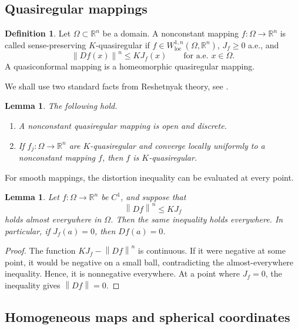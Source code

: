 \documentclass[10pt]{amsart}
\numberwithin{equation}{section}
\newtheorem{lemma}[theorem]{Lemma}
\theoremstyle{definition}
\newtheorem{definition}[theorem]{Definition}
\newcommand{\R}{\mathbb R}
\newcommand{\norm}[1]{\left\|#1\right\|}
\begin{document}
\subsection{Quasiregular mappings}

\begin{definition}
Let \(\Omega\subset\R^n\) be a domain. A nonconstant mapping
\(f:\Omega\to\R^n\) is called sense-preserving \(K\)-quasiregular if
\(f\in W^{1,n}_{\operatorname{loc}}(\Omega,\R^n)\), \(J_f\ge0\) a.e., and
\[
        \norm{Df(x)}^n\le KJ_f(x)
        \qquad\text{for a.e. }x\in\Omega .
\]
A quasiconformal mapping is a homeomorphic quasiregular mapping.
\end{definition}

We shall use two standard facts from Reshetnyak theory, see
\cite{Reshetnyak,Rickman,Vaisala}.

\begin{lemma}
\label{lem-reshetnyak}
The following hold.
\begin{enumerate}[label=(\roman*)]
\item A nonconstant quasiregular mapping is open and discrete.
\item If \(f_j:\Omega\to\R^n\) are \(K\)-quasiregular and converge locally
uniformly to a nonconstant mapping \(f\), then \(f\) is \(K\)-quasiregular.
\end{enumerate}
\end{lemma}

For smooth mappings, the distortion inequality can be evaluated at every
point.

\begin{lemma}
\label{lem-pointwise-distortion}
Let \(f:\Omega\to\R^n\) be \(C^1\), and suppose that
\[
        \norm{Df}^n\le KJ_f
\]
holds almost everywhere in \(\Omega\). Then the same inequality holds
everywhere. In particular, if \(J_f(a)=0\), then \(Df(a)=0\).
\end{lemma}

\begin{proof}
The function \(KJ_f-\norm{Df}^n\) is continuous. If it were negative at some
point, it would be negative on a small ball, contradicting the
almost-everywhere inequality. Hence, it is nonnegative everywhere. At a point
where \(J_f=0\), the inequality gives \(\norm{Df}=0\).
\end{proof}

\subsection{Homogeneous maps and spherical coordinates}
\end{document}
